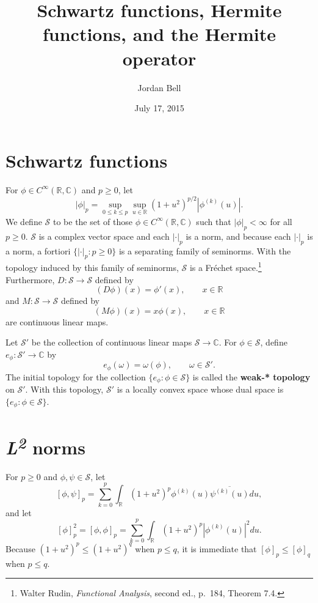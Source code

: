 \documentclass{article}
\theoremstyle{definition}
\theoremstyle{definition}
\begin{document}
\title{Schwartz functions, Hermite functions, and the Hermite operator}
\author{Jordan Bell}
\date{July 17, 2015}

\maketitle


\section{Schwartz functions}
For $\phi \in C^\infty(\mathbb{R},\mathbb{C})$ and $p \geq 0$,
let 
\[
|\phi|_p =\sup_{0 \leq k \leq p} \sup_{u \in \mathbb{R}} (1+u^2)^{p/2} |\phi^{(k)}(u)|.
\]
We define $\mathscr{S}$ to be the set of those 
$\phi \in C^\infty(\mathbb{R},\mathbb{C})$ such that $|\phi|_p<\infty$ for all $p \geq 0$. 
$\mathscr{S}$ is a complex vector space 
and each $|\cdot|_p$ is a norm, and
because each $|\cdot|_p$ is a norm, a fortiori $\{|\cdot|_p:  p \geq 0\}$ is a separating family of seminorms.
With the topology induced by this family of seminorms, $\mathscr{S}$ is a Fr\'echet space.\footnote{Walter
Rudin, {\em Functional Analysis}, second ed., p.~184, Theorem 7.4.}
Furthermore, $D:\mathscr{S} \to \mathscr{S}$ defined by
\[
(D\phi)(x) = \phi'(x),\qquad x \in \mathbb{R}
\]
and $M:\mathscr{S} \to \mathscr{S}$ defined by
\[
(M\phi)(x) = x\phi(x),\qquad x \in \mathbb{R}
\]
are continuous linear maps. 

Let $\mathscr{S}'$ be the collection of continuous linear maps $\mathscr{S}
\to \mathbb{C}$.
For $\phi \in \mathscr{S}$, define $e_\phi:\mathscr{S}' \to \mathbb{C}$ by
\[
e_\phi(\omega) = \omega(\phi), \qquad \omega \in \mathscr{S}'.
\]
The initial topology for the collection
$\{e_\phi: \phi \in \mathscr{S}\}$ is called the \textbf{weak-* topology} on $\mathscr{S}'$. 
With this topology, $\mathscr{S}'$ is a locally convex space whose dual space
is $\{e_\phi: \phi \in \mathscr{S}\}$.



\section{{\em L\textsuperscript{2}} norms}
\label{L2norms}
For $p \geq 0$ and $\phi,\psi \in \mathscr{S}$, let 
\[
[\phi,\psi]_p = \sum_{k=0}^p \int_{\mathbb{R}} (1+u^2)^{p} \phi^{(k)}(u)  \overline{\psi^{(k)}(u)} du,
\]
and let
\[
[\phi]_p^2 = [\phi,\phi]_p=  \sum_{k=0}^p \int_{\mathbb{R}} (1+u^2)^p |\phi^{(k)}(u)|^2 du.
\]
Because $(1+u^2)^p \leq (1+u^2)^q$ when $p \leq q$, it is immediate that
$[\phi]_p \leq [\phi]_q$ when $p \leq q$. 
\end{document}
